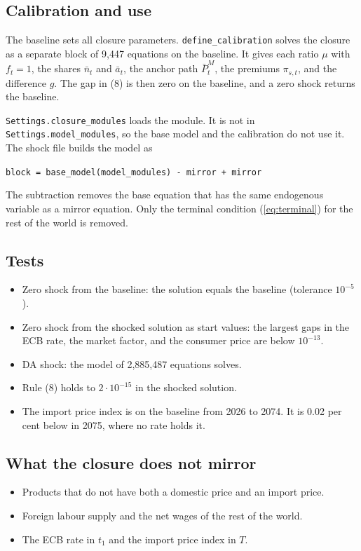 \documentclass[11pt,a4paper]{article}
\newcommand{\code}[1]{\texttt{#1}}
\begin{document}
\subsection{Calibration and use}

The baseline sets all closure parameters.
\code{define\_calibration} solves the closure as a separate block of 9{,}447 equations on the baseline.
It gives each ratio $\mu$ with $f_t = 1$, the shares $\bar{n}_t$ and $\bar{a}_t$, the anchor path $\bar{P}^M_t$, the premiums $\pi_{s,t}$, and the difference $g$.
The gap in (8) is then zero on the baseline, and a zero shock returns the baseline.

\code{Settings.closure\_modules} loads the module. It is not in \code{Settings.model\_modules}, so the base model and the calibration do not use it.
The shock file builds the model as
\begin{center}
\code{block = base\_model(model\_modules) - mirror + mirror}
\end{center}
The subtraction removes the base equation that has the same endogenous variable as a mirror equation. Only the terminal condition (\ref{eq:terminal}) for the rest of the world is removed.

\subsection{Tests}

\begin{itemize}
\item Zero shock from the baseline: the solution equals the baseline (tolerance $10^{-5}$).
\item Zero shock from the shocked solution as start values: the largest gaps in the ECB rate, the market factor, and the consumer price are below $10^{-13}$.
\item DA shock: the model of 2{,}885{,}487 equations solves.
\item Rule (8) holds to $2 \cdot 10^{-15}$ in the shocked solution.
\item The import price index is on the baseline from 2026 to 2074. It is 0.02 per cent below in 2075, where no rate holds it.
\end{itemize}

\subsection{What the closure does not mirror}

\begin{itemize}
\item Products that do not have both a domestic price and an import price.
\item Foreign labour supply and the net wages of the rest of the world.
\item The ECB rate in $t_1$ and the import price index in $T$.
\end{itemize}
\end{document}
